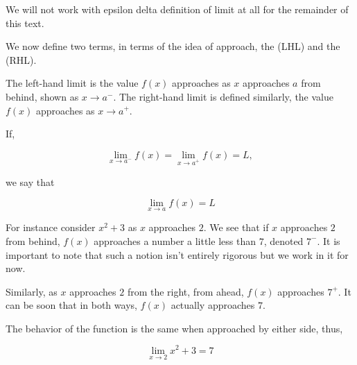  We will not work with epsilon delta definition of limit at all for the remainder of this text.

 We now define two terms, in terms of the idea of approach, the (LHL)
 and the (RHL).

 The left-hand limit is the value \(f(x)\) approaches as \(x\) approaches \(a\) from behind, shown as 
 \(x \to a^-\). The right-hand limit is defined similarly, the value \(f(x)\) approaches as 
 \(x \to a^+\).

 If, 

 \begin{equation*}
    \lim_{x \to a^-} f(x) = \lim_{x \to a^+} f(x) = L,
 \end{equation*}

 we say that

 \begin{equation*}
    \lim_{x \to a} f(x) = L
 \end{equation*}

 For instance consider \(x^2 + 3\) as \(x\) approaches \(2\). We see that if 
 \(x\) approaches \(2\) from behind, \(f(x)\) approaches a number a little less than \(7\),
 denoted \(7^-\). It is important to note that such a notion isn't entirely rigorous but we 
 work in it for now.

 Similarly, as \(x\) approaches \(2\) from the right, from ahead, \(f(x)\) approaches 
 \(7^+\). It can be soon that in both ways, \(f(x)\) actually approaches \(7\).

 The behavior of the function is the same when approached by 
 either side, thus, 

 \begin{equation*}
    \lim_{x \to 2} x^2 + 3 = 7
 \end{equation*}